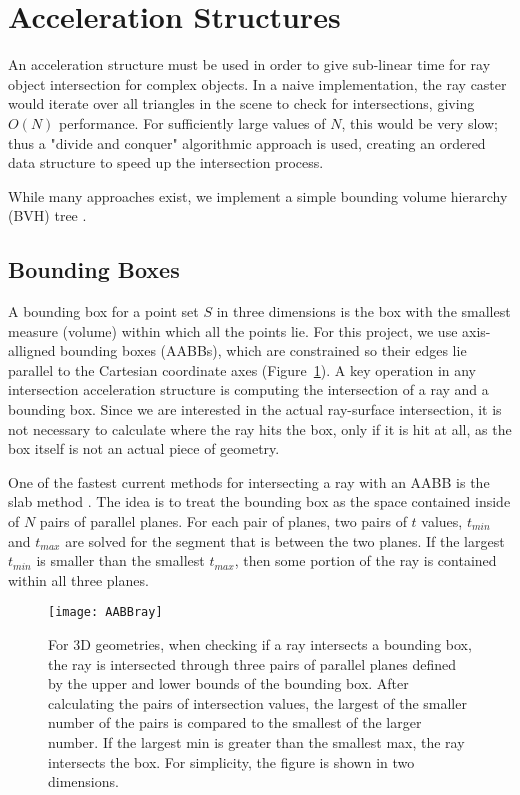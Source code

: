 \section{Acceleration Structures}

An acceleration structure must be used in order to give sub-linear time for ray object intersection for complex objects.
In a naive implementation, the ray caster would iterate over all triangles in the scene to check for intersections, giving $O(N)$ performance.
For sufficiently large values of $N$, this would be very slow; thus a "divide and conquer" algorithmic approach is used, creating an ordered data structure to speed up the intersection process.

While many approaches exist, we implement a simple bounding volume hierarchy (BVH) tree \autocite{bvh}.

\subsection{Bounding Boxes}

A bounding box for a point set $S$ in three dimensions is the box with the smallest measure (volume) within which all the points lie.
For this project, we use axis-alligned bounding boxes (AABBs), which are constrained so their edges lie parallel to the Cartesian coordinate axes (Figure~\ref{fig:aabbray}).
A key operation in any intersection acceleration structure is computing the intersection of a ray and a bounding box.
Since we are interested in the actual ray-surface intersection, it is not necessary to calculate where the ray hits the box, only if it is hit at all, as the box itself is not an actual piece of geometry.

One of the fastest current methods for intersecting a ray with an AABB is the slab method \autocite{hypergraph}.
The idea is to treat the bounding box as the space contained inside of $N$ pairs of parallel planes.
For each pair of planes, two pairs of $t$ values, $t_{min}$ and $t_{max}$ are solved for the segment that is between the two planes.
If the largest $t_{min}$ is smaller than the smallest $t_{max}$, then some portion of the ray is contained within all three planes.

\begin{figure}
\label{fig:aabbray}
\texttt{[image: AABBray]}
\caption[AABB Intersection]{For 3D geometries, when checking if a ray intersects a bounding box, the ray is intersected through three pairs of parallel planes defined by the upper and lower bounds of the bounding box. After calculating the pairs of intersection values, the largest of the smaller number of the pairs is compared to the smallest of the larger number. If the largest min is greater than the smallest max, the ray intersects the box. For simplicity, the figure is shown in two dimensions.}
\end{figure}

